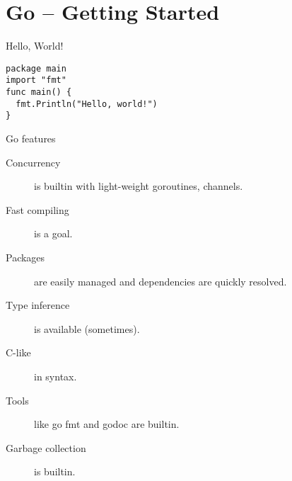 
\section{Go -- Getting Started}

\begin{frame}[fragile]{Hello, World!}
  \begin{verbatim}
package main
import "fmt"
func main() {
  fmt.Println("Hello, world!")
}
  \end{verbatim}
\end{frame}


\begin{frame}{Go features}
  \begin{description}
    \item[Concurrency] is builtin with light-weight goroutines, channels.  
    \item[Fast compiling] is a goal.
    \item[Packages] are easily managed and dependencies are quickly resolved.
    \item[Type inference] is available (sometimes).
    \item[C-like] in syntax. 
    \item[Tools] like go fmt and godoc are builtin. 
    \item[Garbage collection] is builtin.
  \end{description}
\end{frame}